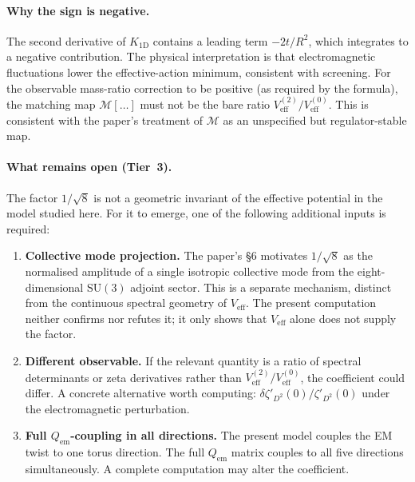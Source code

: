 \paragraph{Why the sign is negative.}
The second derivative of $K_{1\mathrm{D}}$ contains a leading term
$-2t/R^2$, which integrates to a negative contribution.  The physical
interpretation is that electromagnetic fluctuations lower the
effective-action minimum, consistent with screening.  For the
observable mass-ratio correction to be positive (as required by the
formula), the matching map $\mathcal{M}[\ldots]$ must not be the
bare ratio $V_{\mathrm{eff}}^{(2)}/V_{\mathrm{eff}}^{(0)}$.  This is
consistent with the paper's treatment of $\mathcal{M}$ as an
unspecified but regulator-stable map.

\paragraph{What remains open (Tier~3).}
The factor $1/\sqrt{8}$ is not a geometric invariant of the
effective potential in the model studied here.  For it to emerge,
one of the following additional inputs is required:

\begin{enumerate}[label=(\alph*)]
  \item \textbf{Collective mode projection.}  The paper's §6
        motivates $1/\sqrt{8}$ as the normalised amplitude of a
        single isotropic collective mode from the eight-dimensional
        $\mathrm{SU}(3)$ adjoint sector.  This is a separate
        mechanism, distinct from the continuous spectral geometry of
        $V_{\mathrm{eff}}$.  The present computation neither confirms
        nor refutes it; it only shows that $V_{\mathrm{eff}}$ alone
        does not supply the factor.

  \item \textbf{Different observable.}  If the relevant quantity is
        a ratio of spectral determinants or zeta derivatives rather
        than $V_{\mathrm{eff}}^{(2)}/V_{\mathrm{eff}}^{(0)}$, the
        coefficient could differ.  A concrete alternative worth
        computing:
        $\delta\zeta'_{D^2}(0)/\zeta'_{D^2}(0)$ under the
        electromagnetic perturbation.

  \item \textbf{Full $Q_{\mathrm{em}}$-coupling in all directions.}
        The present model couples the EM twist to one torus direction.
        The full $Q_{\mathrm{em}}$ matrix couples to all five
        directions simultaneously.  A complete computation may alter
        the coefficient.
\end{enumerate}

